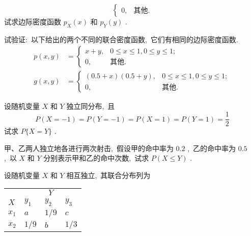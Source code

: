 \begin{xiti}
\begin{equation*}
\begin{cases}
   			0, & \text{其他}.
   			\end{cases}
   		\end{equation*}
   		试求边际密度函数 $p_{X}(x)$ 和 $p_{Y}(y)$ .
   		\item 试验证:\ 以下给出的两个不同的联合密度函数,\ 它们有相同的边际密度函数.
   		\begin{align*}
   			p(x,y) &= \begin{cases}
   			x+y, & 0\leqslant x\leqslant1,0\leqslant y\leqslant1;\\
   			0, & \text{其他}.
   			\end{cases}\\
   			g(x,y) &= \begin{cases}
   			(0.5+x)(0.5+y), & 0\leqslant x\leqslant1,0\leqslant y\leqslant1;\\
   			0, & \text{其他}.
   			\end{cases}
   		\end{align*}
   		\item 设随机变量 $X$ 和 $Y$ 独立同分布,\ 且
   		\begin{equation*}
   			P(X=-1)=P(Y=-1)=P(X=1)=P(Y=1)=\frac{1}{2}
   		\end{equation*}
   		试求 $P\{X=Y\}$ .
   		\item 甲、乙两人独立地各进行两次射击,\ 假设甲的命中率为 $0.2$ ,\ 乙的命中率为 $0.5$ ,\ 以 $X$ 和 $Y$ 分别表示甲和乙的命中次数,\ 试求 $P(X\leqslant Y)$ .
   		\item 设随机变量 $X$ 和 $Y$ 相互独立,\ 其联合分布列为
   		\begin{center}
   			\begin{tabularx}{0.8\textwidth}{ZZZZ}
   				\hline
   				 & \\
   				$X$ & $y_1$ & $y_2$ & $y_3$\\
   				\hline
   				$x_1$ & $a$ & $1/9$ & $c$\\
   				\hline
   				$x_2$ & $1/9$ & $b$ & $1/3$\\
   				\hline
   			\end{tabularx}
   		\end{center}
   	

\end{xiti}
